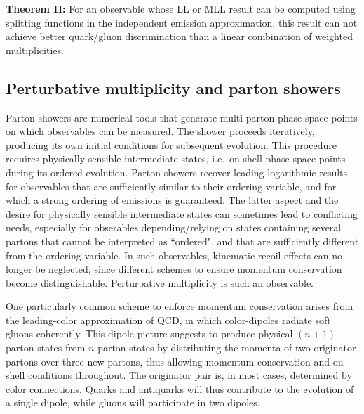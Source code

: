 \documentclass[letterpaper,11pt]{article}
\begin{document}
\vspace{1cm}
{\bf Theorem II:} For an observable whose LL or MLL result can be computed using splitting functions in the independent emission approximation, this result can not achieve better quark/gluon discrimination than a linear combination of weighted multiplicities.
\vspace{1cm}


\subsection{Perturbative multiplicity and parton showers}
\label{sec:ps_multis}

Parton showers are numerical tools that generate multi-parton 
phase-space points on which observables can be measured. The shower proceeds 
iteratively, producing its own initial conditions for subsequent evolution.
This procedure requires physically sensible intermediate states, i.e.\ on-shell 
phase-space points during its ordered evolution. Parton showers recover 
leading-logarithmic results for observables that are sufficiently similar to 
their ordering variable, and for which a strong ordering of emissions is 
guaranteed. The latter aspect and the desire for physically sensible 
intermediate states can sometimes lead to conflicting needs, especially for
obserables depending/relying on states containing several partons that cannot
be interpreted as ``ordered", and that are sufficiently different from
the ordering variable. In such observables, kinematic recoil effects can no 
longer be neglected, since different schemes to ensure momentum conservation 
become distinguishable. Perturbative multiplicity is such an observable.

One particularly common scheme to enforce momentum conservation arises from
the leading-color approximation of QCD, in which color-dipoles radiate soft
gluons coherently. This dipole picture suggests to produce physical 
$(n+1)$-parton states from $n$-parton states by distributing the momenta
of two originator partons over three new partons, thus allowing 
momentum-conservation and on-shell conditions throughout. The originator
pair is, in most cases, determined by color connections. Quarks and antiquarks
will thus contribute to the evolution of a single dipole, while gluons 
will participate in two dipoles. 
\end{document}
